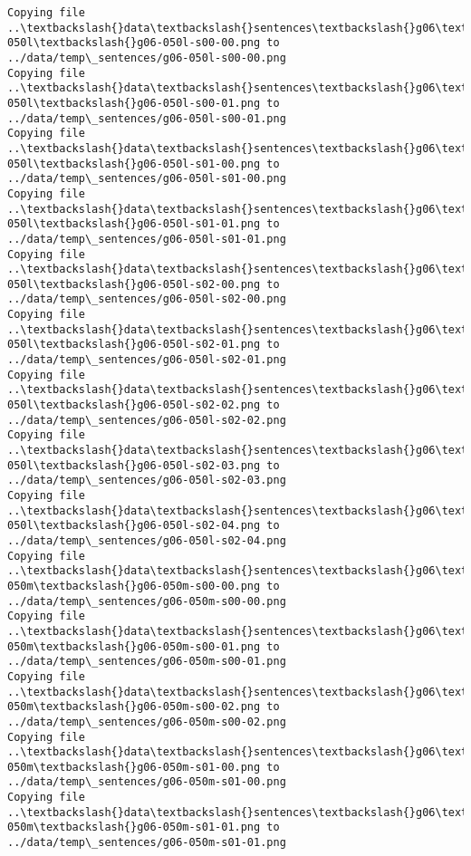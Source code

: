 \documentclass[11pt]{article}
\begin{document}
\begin{Verbatim}[commandchars=\\\{\}]
Copying file ..\textbackslash{}data\textbackslash{}sentences\textbackslash{}g06\textbackslash{}g06-050l\textbackslash{}g06-050l-s00-00.png to
../data/temp\_sentences/g06-050l-s00-00.png
Copying file ..\textbackslash{}data\textbackslash{}sentences\textbackslash{}g06\textbackslash{}g06-050l\textbackslash{}g06-050l-s00-01.png to
../data/temp\_sentences/g06-050l-s00-01.png
Copying file ..\textbackslash{}data\textbackslash{}sentences\textbackslash{}g06\textbackslash{}g06-050l\textbackslash{}g06-050l-s01-00.png to
../data/temp\_sentences/g06-050l-s01-00.png
Copying file ..\textbackslash{}data\textbackslash{}sentences\textbackslash{}g06\textbackslash{}g06-050l\textbackslash{}g06-050l-s01-01.png to
../data/temp\_sentences/g06-050l-s01-01.png
Copying file ..\textbackslash{}data\textbackslash{}sentences\textbackslash{}g06\textbackslash{}g06-050l\textbackslash{}g06-050l-s02-00.png to
../data/temp\_sentences/g06-050l-s02-00.png
Copying file ..\textbackslash{}data\textbackslash{}sentences\textbackslash{}g06\textbackslash{}g06-050l\textbackslash{}g06-050l-s02-01.png to
../data/temp\_sentences/g06-050l-s02-01.png
Copying file ..\textbackslash{}data\textbackslash{}sentences\textbackslash{}g06\textbackslash{}g06-050l\textbackslash{}g06-050l-s02-02.png to
../data/temp\_sentences/g06-050l-s02-02.png
Copying file ..\textbackslash{}data\textbackslash{}sentences\textbackslash{}g06\textbackslash{}g06-050l\textbackslash{}g06-050l-s02-03.png to
../data/temp\_sentences/g06-050l-s02-03.png
Copying file ..\textbackslash{}data\textbackslash{}sentences\textbackslash{}g06\textbackslash{}g06-050l\textbackslash{}g06-050l-s02-04.png to
../data/temp\_sentences/g06-050l-s02-04.png
Copying file ..\textbackslash{}data\textbackslash{}sentences\textbackslash{}g06\textbackslash{}g06-050m\textbackslash{}g06-050m-s00-00.png to
../data/temp\_sentences/g06-050m-s00-00.png
Copying file ..\textbackslash{}data\textbackslash{}sentences\textbackslash{}g06\textbackslash{}g06-050m\textbackslash{}g06-050m-s00-01.png to
../data/temp\_sentences/g06-050m-s00-01.png
Copying file ..\textbackslash{}data\textbackslash{}sentences\textbackslash{}g06\textbackslash{}g06-050m\textbackslash{}g06-050m-s00-02.png to
../data/temp\_sentences/g06-050m-s00-02.png
Copying file ..\textbackslash{}data\textbackslash{}sentences\textbackslash{}g06\textbackslash{}g06-050m\textbackslash{}g06-050m-s01-00.png to
../data/temp\_sentences/g06-050m-s01-00.png
Copying file ..\textbackslash{}data\textbackslash{}sentences\textbackslash{}g06\textbackslash{}g06-050m\textbackslash{}g06-050m-s01-01.png to
../data/temp\_sentences/g06-050m-s01-01.png

\end{Verbatim}
\end{document}

